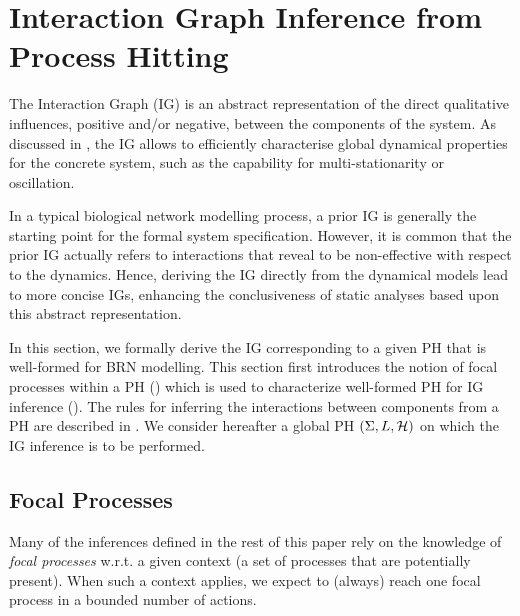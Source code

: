 \section{Interaction Graph Inference from Process Hitting}\label{sec:infer-IG}

The Interaction Graph (IG) is an abstract representation of the direct qualitative influences,
positive and/or negative, between the components of the system.
As discussed in , the IG allows to efficiently characterise global dynamical
properties for the concrete system, such as the capability for multi-stationarity or oscillation.

In a typical biological network modelling process, a prior IG is generally the starting point for
the formal system specification.
However, it is common that the prior IG actually refers to interactions that reveal to be 
non-effective with respect to the dynamics.
Hence, deriving the IG directly from the dynamical models lead to more concise IGs, enhancing the
conclusiveness of static analyses based upon this abstract representation.

In this section, we formally derive the IG corresponding to a given PH that is well-formed for BRN
modelling.
%
%
%
This section first introduces the notion of focal processes within a PH ()
which is used to characterize well-formed PH for IG inference ().
The rules for inferring the interactions between components from a PH are
described in .
We consider hereafter a global PH $(\Sigma,L,\mathcal{H})$ on which the IG inference is to be
performed.



\subsection{Focal Processes}\label{ssec:focal}

Many of the inferences defined in the rest of this paper rely on the knowledge of \emph{focal
processes} w.r.t. a given context (a set of processes that are potentially present).
When such a context applies, we expect to (always) reach one focal process in a bounded number of
actions.

